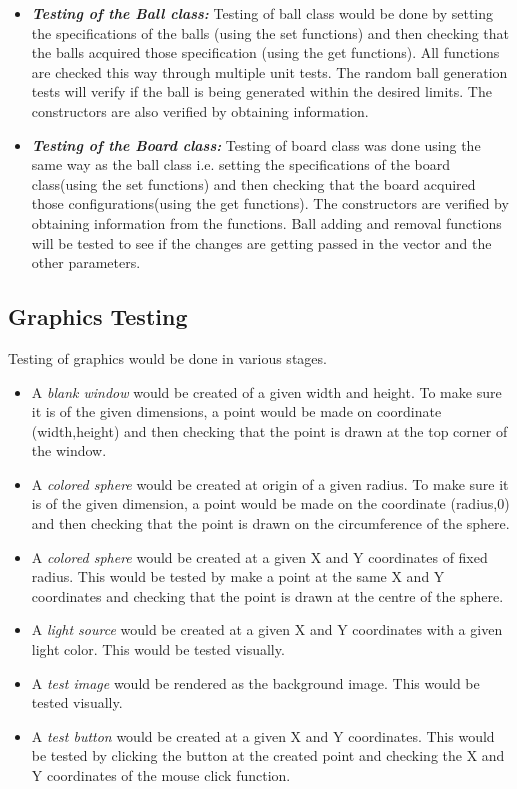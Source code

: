 \documentclass{article}
\begin{document}
\begin{itemize}
\item \textbf{\textit{Testing of the Ball class:}}
Testing of ball class would be done by setting the specifications of the balls (using the set functions) and then checking that the balls acquired those specification (using the get functions). All functions are checked this way through multiple unit tests. The random ball generation tests will verify if the ball is being generated within the desired limits. The constructors are also verified by obtaining information.

\item \textbf{\textit{Testing of the Board class:}}
Testing of board class was done using the same way as the ball class i.e. setting the specifications of the board class(using the set functions) and then checking that the board acquired those configurations(using the get functions). The constructors are verified by obtaining information from the functions. Ball adding and removal functions will be tested to see if the changes are getting passed in the vector and the other parameters.
\end{itemize}

\subsection{Graphics Testing}
Testing of graphics would be done in various stages. 
\begin{itemize}
\item A \textit{blank window} would be created of a given width and height. To make sure it is of the given dimensions, a point would be made on coordinate (width,height) and then checking that the point is drawn at the top corner of the window. 
\item A \textit{colored sphere} would be created at origin of a given radius. To make sure it is of the given dimension, a point would be made on the coordinate (radius,0) and then checking that the point is drawn on the circumference of the sphere.
\item A \textit{colored sphere} would be created at a given X and Y coordinates of fixed radius. This would be tested by make a point at the same X and Y coordinates and checking that the point is drawn at the centre of the sphere.
\item A \textit{light source} would be created at a given X and Y coordinates with a given light color. This would be tested visually.
\item A \textit{test image} would be rendered as the background image. This would be tested visually.
\item A \textit{test button} would be created at a given X and Y coordinates. This would be tested by clicking the button at the created point and checking the X and Y coordinates of the mouse click function.
\end{itemize}
\end{document}
